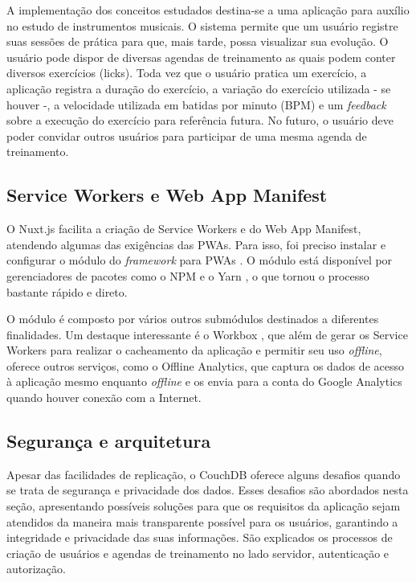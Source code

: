 \documentclass[
	article,			%
	11pt,				%
	oneside,			%
	a4paper,			%
	english,			%
	brazil,				%
	sumario=tradicional
	]{abntex2}
\begin{document}
A implementação dos conceitos estudados destina-se a uma aplicação para auxílio no estudo de instrumentos musicais. O sistema permite que um usuário registre suas sessões de prática para que, mais tarde, possa visualizar sua evolução. O usuário pode dispor de diversas agendas de treinamento as quais podem conter diversos exercícios (licks). Toda vez que o usuário pratica um exercício, a aplicação registra a duração do exercício, a variação do exercício utilizada - se houver -, a velocidade utilizada em batidas por minuto (BPM) e um \textit{feedback} sobre a execução do exercício para referência futura. No futuro, o usuário deve poder convidar outros usuários para participar de uma mesma agenda de treinamento.

\subsection{Service Workers e Web App Manifest}

O Nuxt.js facilita a criação de Service Workers e do Web App Manifest, atendendo algumas das exigências das PWAs. Para isso, foi preciso instalar e configurar o módulo do \textit{framework} para PWAs \cite{nuxt-pwa-2018}. O módulo está disponível por gerenciadores de pacotes como o NPM \cite{npm-2017} e o Yarn \cite{yarn-2017}, o que tornou o processo bastante rápido e direto.

O módulo é composto por vários outros submódulos destinados a diferentes finalidades. Um destaque interessante é o Workbox \cite{workbox-2018}, que além de gerar os Service Workers para realizar o cacheamento da aplicação e permitir seu uso \textit{offline}, oferece outros serviços, como o Offline Analytics, que captura os dados de acesso à aplicação mesmo enquanto \textit{offline} e os envia para a conta do Google Analytics quando houver conexão com a Internet.

\subsection{Segurança e arquitetura}

Apesar das facilidades de replicação, o CouchDB oferece alguns desafios quando se trata de segurança e privacidade dos dados. Esses desafios são abordados nesta seção, apresentando possíveis soluções para que os requisitos da aplicação sejam atendidos da maneira mais transparente possível para os usuários, garantindo a integridade e privacidade das suas informações. São explicados os processos de criação de usuários e agendas de treinamento no lado servidor, autenticação e autorização.
\end{document}
